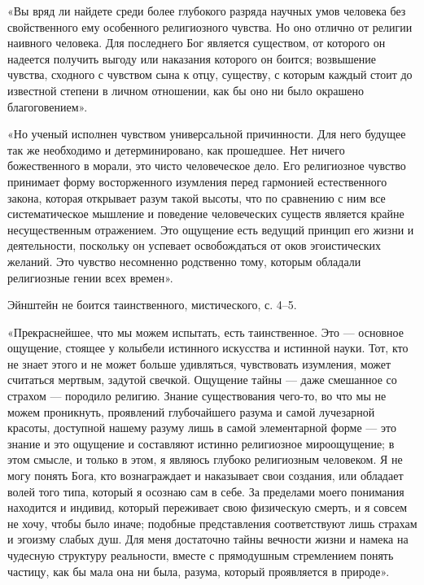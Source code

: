 «Вы  вряд  ли  найдете  среди более  глубокого  разряда  научных  умов
человека без свойственного ему особенного религиозного чувства. Но оно
отлично  от религии  наивного  человека. Для  последнего Бог  является
существом,  от  которого он  надеется  получить  выгоду или  наказания
которого он  боится; возвышение  чувства, сходного  с чувством  сына к
отцу, существу, с  которым каждый стоит до известной  степени в личном
отношении, как бы оно ни было окрашено благоговением».

«Но  ученый  исполнен  чувством универсальной  причинности.  Для  него
будущее  так  же  необходимо  и детерминировано,  как  прошедшее.  Нет
ничего  божественного  в  морали,  это чисто  человеческое  дело.  Его
религиозное  чувство  принимает  форму восторженного  изумления  перед
гармонией естественного закона, которая  открывает разум такой высоты,
что  по  сравнению с  ним  все  систематическое мышление  и  поведение
человеческих  существ является  крайне несущественным  отражением. Это
ощущение есть ведущий  принцип его жизни и  деятельности, поскольку он
успевает  освобождаться от  оков  эгоистических  желаний. Это  чувство
несомненно родственно  тому, которым  обладали религиозные  гении всех
времен».

Эйнштейн не боится таинственного, мистического, с. 4--5.

«Прекраснейшее,  что мы  можем  испытать, есть  таинственное. Это  ---
основное ощущение,  стоящее у колыбели истинного  искусства и истинной
науки.  Тот,  кто  не  знает  этого  и  не  может  больше  удивляться,
чувствовать  изумления,  может  считаться  мертвым,  задутой  свечкой.
Ощущение тайны  --- даже  смешанное со  страхом ---  породило религию.
Знание  существования   чего-то,  во  что  мы   не  можем  проникнуть,
проявлений глубочайшего  разума и самой лучезарной  красоты, доступной
нашему разуму  лишь в самой  элементарной форме  --- это знание  и это
ощущение и составляют истинно религиозное мироощущение; в этом смысле,
и  только  в этом,  я  являюсь  глубоко  религиозным человеком.  Я  не
могу  понять  Бога,  кто  вознаграждает и  наказывает  свои  создания,
или  обладает волей  того  типа,  который я  осознаю  сам  в себе.  За
пределами моего понимания находится и индивид, который переживает свою
физическую  смерть, и  я совсем  не хочу,  чтобы было  иначе; подобные
представления  соответствуют лишь  страхам и  эгоизму слабых  душ. Для
меня достаточно  тайны вечности жизни  и намека на  чудесную структуру
реальности, вместе  с прямодушным  стремлением понять частицу,  как бы
мала она ни была, разума, который проявляется в природе».

